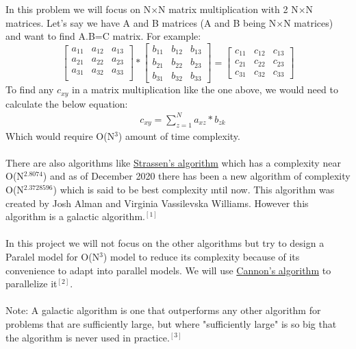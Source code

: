 In this problem we will focus on N$\times$N matrix multiplication with 2 N$\times$N matrices. Let's say we have A and B matrices (A and B being N$\times$N matrices) and want to find A.B=C matrix. For example:
\[
\begin{bmatrix}
a_{11}  &  a_{12} & a_{13}      \\
a_{21}  &  a_{22} & a_{23}      \\
a_{31}  &  a_{32} & a_{33}      \\
\end{bmatrix}
*
\begin{bmatrix}
b_{11}  &  b_{12} & b_{13}     \\
b_{21}  &  b_{22} & b_{23}     \\
b_{31}  &  b_{32} & b_{33}
\end{bmatrix}
=
\begin{bmatrix}
c_{11}  &  c_{12} & c_{13}      \\
c_{21}  &  c_{22} & c_{23}      \\
c_{31}  &  c_{32} & c_{33}      

\end{bmatrix}
\]
To find any $c_{xy}$ in a matrix multiplication like the one above, we would need to calculate the below equation:
\begin{equation*}
\begin{split}
\quad c_{xy}=\sum_{z=1}^{N}a_{xz}*b_{zk}
\end{split}
\end{equation*}
Which would require O(N$^3$) amount of time complexity. \\
\\
There are also algorithms like \href{https://en.wikipedia.org/wiki/Strassen_algorithm}{Strassen's algorithm} which has a complexity near O(N$^{2.8074}$) and as of December 2020 there has been a new algorithm of complexity O(N$^{2.3728596}$) which is said to be best complexity ıntil now. This algorithm was created by Josh Alman and Virginia Vassilevska Williams. However this algorithm is a galactic algorithm.$^{[1]}$\\
\\
In this project we will not focus on the other algorithms but try to design a Paralel model for O(N$^3$) model to reduce its complexity because of its convenience to adapt into parallel models. We will use \href{https://en.wikipedia.org/wiki/Cannon%27s_algorithm}{Cannon's algorithm} to parallelize it$^{[2]}$.\\
\\
Note: A galactic algorithm is one that outperforms any other algorithm for problems that are sufficiently large, but where "sufficiently large" is so big that the algorithm is never used in practice.$^{[3]}$